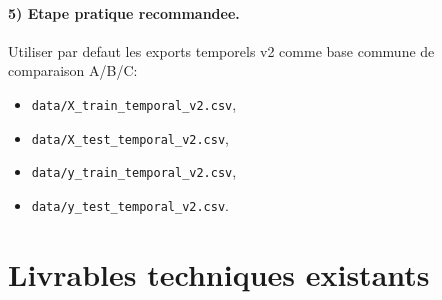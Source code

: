 \documentclass[11pt,a4paper]{article}
\begin{document}
\paragraph{5) Etape pratique recommandee.}
Utiliser par defaut les exports temporels v2 comme base commune de comparaison A/B/C:
\begin{itemize}[leftmargin=1.2cm]
  \item \texttt{data/X\_train\_temporal\_v2.csv},
  \item \texttt{data/X\_test\_temporal\_v2.csv},
  \item \texttt{data/y\_train\_temporal\_v2.csv},
  \item \texttt{data/y\_test\_temporal\_v2.csv}.
\end{itemize}

\section{Livrables techniques existants}
\end{document}

